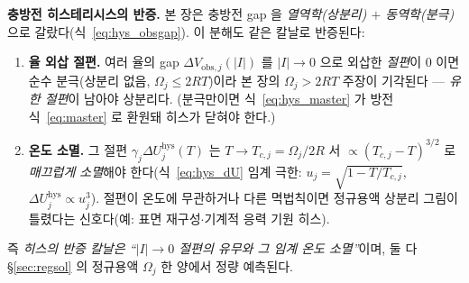 \documentclass[11pt,a4paper]{article}
\newcommand{\hys}{\mathrm{hys}}
\begin{document}
\textbf{충방전 히스테리시스의 반증.} 본 장은 충방전 gap 을 \emph{열역학(상분리) $+$ 동역학(분극)}으로
갈랐다(식~\eqref{eq:hys_obsgap}). 이 분해도 같은 칼날로 반증된다:
\begin{enumerate}[label=(\roman*),leftmargin=2.0em,itemsep=2pt]
\item \textbf{율 외삽 절편.} 여러 율의 gap $\Delta V_{\mathrm{obs},j}(|I|)$ 를 $|I|\to0$ 으로 외삽한 \emph{절편}이 $0$ 이면
  순수 분극(상분리 없음, $\Omega_j\le2RT$)이라 본 장의 $\Omega_j>2RT$ 주장이 기각된다 — \emph{유한 절편}이 남아야
  상분리다. (분극만이면 식~\eqref{eq:hys_master} 가 방전식~\eqref{eq:master} 로 환원돼 히스가 닫혀야 한다.)
\item \textbf{온도 소멸.} 그 절편 $\gamma_j\Delta U_j^\hys(T)$ 는 $T\to T_{c,j}=\Omega_j/2R$ 서
  $\propto(T_{c,j}-T)^{3/2}$ 로 \emph{매끄럽게 소멸}해야 한다(식~\eqref{eq:hys_dU} 임계 극한:
  $u_j=\sqrt{1-T/T_{c,j}}$, $\Delta U_j^\hys\!\propto\!u_j^3$). 절편이 온도에 무관하거나 다른 멱법칙이면 정규용액
  상분리 그림이 틀렸다는 신호다(예: 표면 재구성$\cdot$기계적 응력 기원 히스).
\end{enumerate}
즉 \emph{히스의 반증 칼날은 ``$|I|\to0$ 절편의 유무와 그 임계 온도 소멸''}이며, 둘 다 \S\ref{sec:regsol} 의
정규용액 $\Omega_j$ 한 양에서 정량 예측된다.
\end{document}
